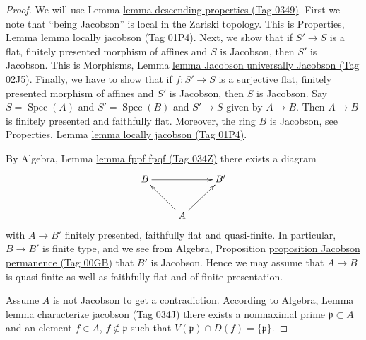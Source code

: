 \documentclass{amsart}
\theoremstyle{plain}
\theoremstyle{definition}
\theoremstyle{remark}
\numberwithin{equation}{subsection}
\def\Spec{\mathop{\mathrm{Spec}}}
\begin{document}
\begin{proof}
We will use Lemma \href{https://stacks.math.columbia.edu/tag/0349}{lemma descending properties (Tag 0349)}.
First we note that ``being Jacobson'' is local
in the Zariski topology. This is
Properties, Lemma \href{https://stacks.math.columbia.edu/tag/01P4}{lemma locally jacobson (Tag 01P4)}.
Next, we show that if $S' \to S$ is a flat, finitely presented
morphism of affines and $S$ is Jacobson, then $S'$ is
Jacobson. This is
Morphisms, Lemma \href{https://stacks.math.columbia.edu/tag/02J5}{lemma Jacobson universally Jacobson (Tag 02J5)}.
Finally, we have to show that if $f : S' \to S$ is a surjective
flat, finitely presented morphism of affines and $S'$ is
Jacobson, then $S$ is Jacobson. Say $S = \Spec(A)$ and
$S' = \Spec(B)$ and $S' \to S$ given by $A \to B$.
Then $A \to B$ is finitely presented and faithfully flat.
Moreover, the ring $B$ is Jacobson, see
Properties, Lemma \href{https://stacks.math.columbia.edu/tag/01P4}{lemma locally jacobson (Tag 01P4)}.

\medskip\noindent
By Algebra, Lemma \href{https://stacks.math.columbia.edu/tag/034Z}{lemma fppf fpqf (Tag 034Z)} there exists a diagram
$$
\xymatrix{
B \ar[rr] & & B' \\
& A \ar[ru] \ar[lu] &
}
$$
with $A \to B'$ finitely presented, faithfully flat and quasi-finite.
In particular, $B \to B'$ is finite type, and we see from
Algebra, Proposition \href{https://stacks.math.columbia.edu/tag/00GB}{proposition Jacobson permanence (Tag 00GB)}
that $B'$ is Jacobson. Hence we may assume that $A \to B$ is quasi-finite
as well as faithfully flat and of finite presentation.

\medskip\noindent
Assume $A$ is not Jacobson to get a contradiction.
According to Algebra, Lemma \href{https://stacks.math.columbia.edu/tag/034J}{lemma characterize jacobson (Tag 034J)}
there exists a nonmaximal prime $\mathfrak p \subset A$ and
an element $f \in A$, $f \not \in \mathfrak p$ such that
$V(\mathfrak p) \cap D(f) = \{\mathfrak p\}$.


\end{proof}
\end{document}
